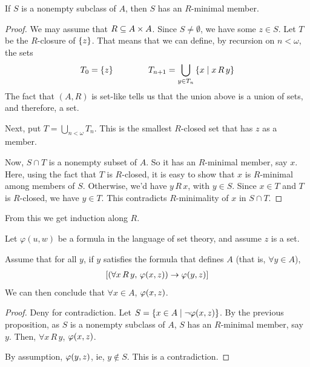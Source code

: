 \begin{boxproposition}
    If $S$ is a nonempty subclass of $A$, then $S$ has an $R$-minimal member.
\end{boxproposition}
\begin{proof}
    We may assume that $R \subseteq A \times A$. Since $S \ne \emptyset$, we have some $z \in S$. Let $T$ be the $R$-closure of $\left\{ z \right\}$. That means that we can define, by recursion on $n < \omega$, the sets
    \begin{align*}
        T_0 = \left\{ z \right\}
        \qquad \qquad
        T_{n + 1} = \bigcup_{y \in T_n} \left\{ x \; \middle\vert \; x \, R \, y \right\}
    \end{align*}
    The fact that $(A, R)$ is set-like tells us that the union above is a union of sets, and therefore, a set.

    Next, put $T = \bigcup_{n < \omega} T_n$. This is the smallest $R$-closed set that has $z$ as a member.

    Now, $S \cap T$ is a nonempty subset of $A$. So it has an $R$-minimal member, say $x$. Here, using the fact that $T$ is $R$-closed, it is easy to show that $x$ is $R$-minimal among members of $S$. Otherwise, we'd have $y \, R \, x$, with $y \in S$. Since $x \in T$ and $T$ is $R$-closed, we have $y \in T$. This contradicts $R$-minimality of $x$ in $S \cap T$.
\end{proof}

From this we get induction along $R$.

\begin{boxtheorem}
    Let $\varphi(u, w)$ be a formula in the language of set theory, and assume $z$ is a set.

    Assume that for all $y$, if $y$ satisfies the formula that defines $A$ (that is, $\forall y \in A$),
    \begin{align*}
        \left[ \left( \forall x \, R \, y, \, \varphi\!\left( x, z \right) \right) \to \varphi\!\left( y, z \right) \right]
    \end{align*}
    We can then conclude that $\forall x \in A$, $\varphi\!\left( x, z \right)$.
\end{boxtheorem}
\begin{proof}
    Deny for contradiction. Let $S = \left\{ x \in A \; \middle\vert \; \neg \varphi\!\left( x, z \right) \right\}$. By the previous proposition, as $S$ is a nonempty subclass of $A$, $S$ has an $R$-minimal member, say $y$. Then, $\forall x \, R \, y$, $\varphi\!\left( x, z \right)$.

    By assumption, $\varphi\!\left( y, z \right)$, ie, $y \notin S$. This is a contradiction.
\end{proof}

